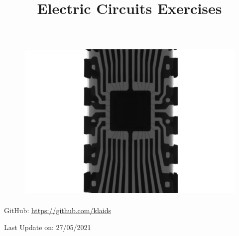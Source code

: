 \documentclass{article}
\title{\Huge Electric Circuits Exercises}
\author{}
\date{}
\begin{document}
\maketitle
\vspace{2cm}
\begin{figure}[h]
\includegraphics[height=8cm]{img/mathew-schwartz-Il3MNqC5Q1E-unsplash.jpg}
\centering
\end{figure}
\vspace{7cm}

\large
\begin{doublespacing}
\hypersetup{
    urlcolor=black,
  }
  \centerline{GitHub: \url{https://github.com/klaids}}


\centerline{Last Update on: 27/05/2021}
\end{doublespacing}
\newpage
\tableofcontents
\clearpage
{}
\newpage


\end{document}
